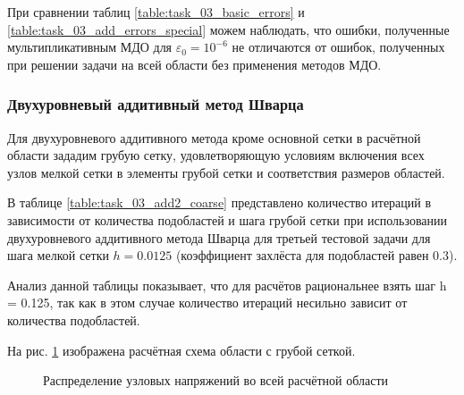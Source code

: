 \documentclass[a4paper]{article}
\begin{document}
При сравнении таблиц \ref{table:task_03_basic_errors} и \ref{table:task_03_add_errors_special} можем наблюдать, что ошибки, полученные мультипликативным МДО для $\varepsilon_0 = 10^{-6}$ не отличаются от ошибок, полученных при решении задачи на всей области без применения методов МДО. 

\newpage

\subsubsection{Двухуровневый аддитивный метод Шварца}

Для двухуровневого аддитивного метода кроме основной сетки в расчётной области зададим грубую сетку, удовлетворяющую условиям включения всех узлов мелкой сетки в элементы грубой сетки и соответствия размеров областей. 

В таблице \ref{table:task_03_add2_coarse} представлено количество итераций в зависимости от количества подобластей и шага грубой сетки при использовании двухуровневого аддитивного метода Шварца для третьей тестовой задачи для шага мелкой сетки $h = 0.0125$ (коэффициент захлёста для подобластей равен 0.3).

Анализ данной таблицы показывает, что для расчётов рациональнее взять шаг h = 0.125, так как в этом случае количество итераций несильно зависит от количества подобластей.

На рис. \ref{fig:task_03_area_coarse} изображена расчётная схема области с грубой сеткой.

\begin{figure}[h]
\caption{Распределение узловых напряжений во всей расчётной области}
\label{fig:task_03_area_coarse}
\end{figure}
\end{document}
